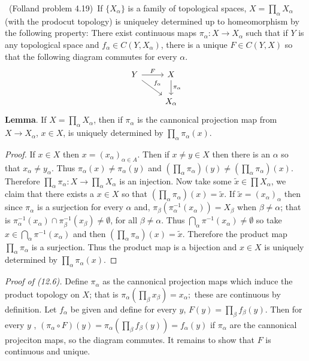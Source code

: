 \documentclass[11pt]{amsart}
\theoremstyle{definition}
\numberwithin{theorem}{section}
\numberwithin{definition}{section}
\numberwithin{equation}{section}
\begin{document}
\medskip {}\ (Folland problem 4.19)\ 
If $\{X_\alpha\}$ is a family of topological spaces, $X = \prod_\alpha X_\alpha$ (with the prodocut topology)
is uniqueley determined up to homeomorphism by the following property: There exist continuous maps $\pi_\alpha : X \to X_\alpha$ such that if $Y$ is any topological space and $f_\alpha \in C(Y, X_\alpha)$, there is a unique $F\in C(Y,X)$ so that the following diagram commutes for every $\alpha.$
\begin{equation*}
	\begin{tikzcd}
		Y \arrow{r}{F} \arrow{rd}{f_\alpha} & X\arrow{d}{\pi_\alpha}\\
		& X_\alpha 
	\end{tikzcd}
\end{equation*}
\noindent \textbf{Lemma}. If $X = \prod_{\alpha} X_\alpha$, then if $\pi_\alpha$ is the cannonical projection map from $X \to X_\alpha$,
$x \in X$, is uniquely determined by $\prod_\alpha \pi_\alpha(x).$
\begin{proof}
	If $x \in X$ then $x = (x_{\alpha})_{\alpha \in A}$. Then if $x \neq y \in X$ then there is an $\alpha$ so that $x_\alpha \neq y_\alpha.$ Thus $\pi_\alpha(x) \neq \pi_\alpha(y)$ and $\left(\prod_\alpha \pi_\alpha\right)(y) \neq \left(\prod_\alpha \pi_\alpha\right)(x)$. Therefore $\prod_\alpha \pi_\alpha: X \to \prod_\alpha X_\alpha$ is an injection. Now take some $\tilde x \in \prod X_\alpha$, we claim that there exists a $x \in X$ so that $\left(\prod_\alpha \pi_\alpha\right)(x) = \tilde x$. If $\tilde x = (x_\alpha)_\alpha$ then since $\pi_\alpha$ is a surjection for every $\alpha$ and, $\pi_\beta(\pi_\alpha^{-1}(x_\alpha)) = X_\beta$ when $\beta \neq \alpha$; that is $\pi_\alpha^{-1}(x_\alpha) \cap \pi_\beta^{-1}(x_\beta) \neq \emptyset$, for all $\beta \neq \alpha$. Thus $\bigcap_{\alpha} \pi^{-1}(x_\alpha) \neq \emptyset$ so take $x \in \bigcap_{\alpha} \pi^{-1}(x_\alpha)$ and then $\left(\prod_\alpha \pi_\alpha\right)(x) = \tilde x$. Therefore the product map $\prod_\alpha \pi_\alpha$ is a surjection. Thus the product map is a bijection and $x \in X$ is uniquely determined by $\prod_\alpha \pi_\alpha(x).$
 \end{proof} 

\noindent \emph{Proof of (12.6).}
	Define $\pi_\alpha$ as the cannonical projection maps which induce the product topology on $X$; that is $\pi_\alpha\left(\prod_\beta x_\beta \right) = x_\alpha;$ these are continuous by definition.  Let $f_\alpha$ be given and define for every $y$, $F(y) = \prod_\beta f_\beta(y)$. Then for every $y$ , $(\pi_\alpha \circ F)(y) = \pi_\alpha\left(\prod_\beta f_\beta(y)\right) = f_\alpha(y)$ if $\pi_\alpha$ are the cannonical projeciton maps, so the diagram commutes. It remains to show that $F$ is continuous and unique. 
\end{document}
